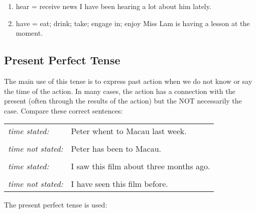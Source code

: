 \begin{enumerate}
\begin{enumerate}
\begin{enumerate}
                    \item hear = receive news
                        \newline
                        I have been hearing a lot about him lately.
                        \newline
                    \item have = eat; drink; take; engage in; enjoy
                        \newline
                        Miss Lam is having a lesson at the moment.
                        \newline
                \end{enumerate}
        \end{enumerate}
\end{enumerate}

\subsection{Present Perfect Tense}
The main use of this tense is to express past action when we do not know or say
the time of the action.
In many cases, the action has a connection with the present (often through the
results of the action) but the NOT necessarily the case.
Compare these correct sentences:
\newline
\begin{tabular}{ll}
    \it{time stated:} & Peter whent to Macau last week. \\ & \\
    \it{time not stated:} & Peter has been to Macau. \\ & \\
    \it{time stated:} & I saw this film about three months ago. \\ & \\
    \it{time not stated:} & I have seen this film before.
\end{tabular}
\newline
\newline
The present perfect tense is used:
